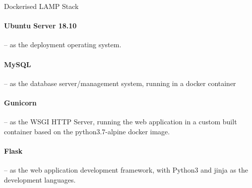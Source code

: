 \begin{displaytable}{\label{display:lamp_stack}}{Dockerised LAMP Stack}
  \paragraph{\href{http://releases.ubuntu.com/18.10/ubuntu-18.10-live-server-amd64.iso}{\faExternalLinkSquare} Ubuntu Server 18.10}
  \hspace{-0.6em}-- as the deployment operating system.
  \paragraph{\href{https://hub.docker.com/\_/mysql}{\faExternalLinkSquare} MySQL}
  \hspace{-0.6em}-- as the database server/management system, running in a docker container 
  \paragraph{\href{https://pypi.org/project/gunicorn/}{\faExternalLinkSquare} Gunicorn}
  \hspace{-0.6em}-- as the WSGI HTTP Server, running the web application in a custom built container based on the python3.7-alpine docker image.
  \paragraph{\href{https://pypi.org/project/Flask/1.0.2/}{\faExternalLinkSquare} Flask}
  \hspace{-0.6em}-- as the web application development framework, with Python3 and jinja as the development languages.
  \vspace{1em}
\end{displaytable}
